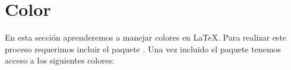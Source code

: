 \documentclass[a4,10pt]{aleph-notas}
\begin{document}
\begin{center}
\end{center}

\section{Color}

En esta sección aprenderemos a manejar colores en \LaTeX{}. Para realizar este proceso requerimos incluir el paquete \verb@xcolor@. Una vez incluido el paquete tenemos acceso a los siguientes colores:
\end{document}
